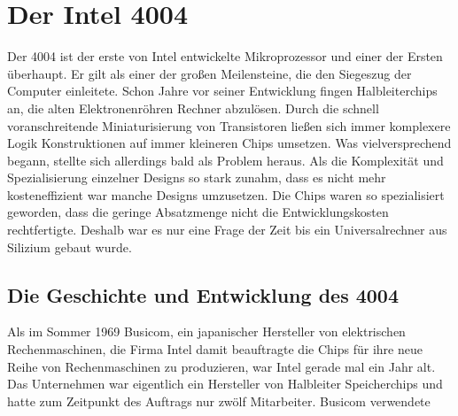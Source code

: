 \newpage
\section{Der Intel 4004}

Der 4004 ist der erste von Intel entwickelte Mikroprozessor und einer der Ersten überhaupt. Er gilt als einer der großen Meilensteine, die den Siegeszug der Computer einleitete. Schon Jahre vor seiner Entwicklung fingen Halbleiterchips an, die alten Elektronenröhren Rechner abzulösen. Durch die schnell voranschreitende Miniaturisierung von Transistoren ließen sich immer komplexere Logik Konstruktionen auf immer kleineren Chips umsetzen. Was vielversprechend begann, stellte sich allerdings bald als Problem heraus. Als die Komplexität und Spezialisierung einzelner Designs so stark zunahm, dass es nicht mehr kosteneffizient war manche Designs umzusetzen. Die Chips waren so spezialisiert geworden, dass die geringe Absatzmenge nicht die Entwicklungskosten rechtfertigte. Deshalb war es nur eine Frage der Zeit bis ein Universalrechner aus Silizium gebaut wurde.
 
\subsection{Die Geschichte und Entwicklung des 4004}

Als im Sommer 1969 Busicom, ein japanischer Hersteller von elektrischen Rechenmaschinen, die Firma Intel damit beauftragte die Chips für ihre neue Reihe von Rechenmaschinen zu produzieren, war Intel gerade mal ein Jahr alt. Das Unternehmen war eigentlich ein Hersteller von Halbleiter Speicherchips und hatte zum Zeitpunkt des Auftrags nur zwölf Mitarbeiter. Busicom verwendete 